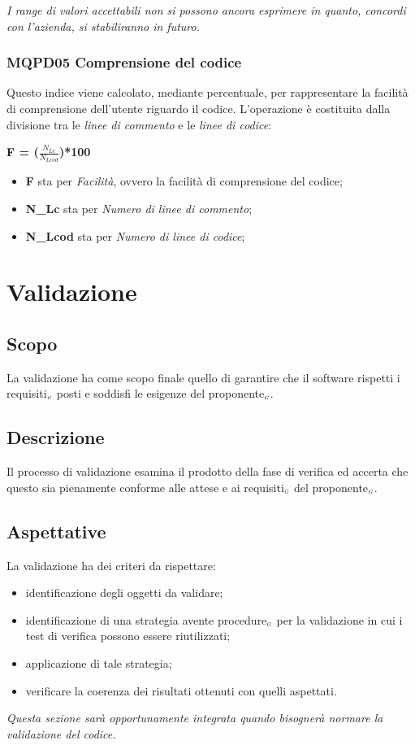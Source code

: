\textit{I range di valori accettabili non si possono ancora esprimere in quanto, concordi con l'azienda, si stabiliranno in futuro.}

\subsubsection{MQPD05 Comprensione del codice}\label{ProcessiDiSupportoVerificaMetricheMQPD05CompresioneDelCodice}
Questo indice viene calcolato, mediante percentuale, per rappresentare la facilità di comprensione dell'utente riguardo il codice.
L'operazione è costituita dalla divisione tra le \textit{linee di commento} e le \textit{linee di codice}:
\begin{center}
	\textbf{F = ($\frac{N_{Lc}}{N_{Lcod}}$)*100}
\end{center}
\begin{itemize}
	\item \textbf{F} sta per \textit{Facilità}, ovvero la facilità di comprensione del codice;
	\item \textbf{N\_Lc} sta per \textit{Numero di linee di commento};
	\item \textbf{N\_Lcod} sta per \textit{Numero di linee di codice};
\end{itemize}

\section{Validazione} \label{ProcessiDiSupportoValidazione}
\subsection{Scopo} \label{ProcessiDiSupportoValidazioneScopo}
La validazione ha come scopo finale quello di garantire che il software rispetti i requisiti$_{\scaleto{G}{3pt}}$ posti e soddisfi le esigenze del proponente$_{\scaleto{G}{3pt}}$.
\subsection{Descrizione} \label{ProcessiDiSupportoValidazioneDescrizione}
Il processo di validazione esamina il prodotto della fase di verifica ed accerta che questo sia pienamente conforme alle attese e ai requisiti$_{\scaleto{G}{3pt}}$ del proponente$_{\scaleto{G}{3pt}}$. 
\subsection{Aspettative} \label{ProcessiDiSupportoValidazioneAspettative}
La validazione ha dei criteri da rispettare:
\begin{itemize}
	\item identificazione degli oggetti da validare;
	\item identificazione di una strategia avente procedure$_{\scaleto{G}{3pt}}$ per la validazione in cui i test di verifica possono essere riutilizzati;
	\item applicazione di tale strategia;
	\item verificare la coerenza dei risultati ottenuti con quelli aspettati.
\end{itemize}
\textit{Questa sezione sarà opportunamente integrata quando bisognerà normare la validazione del codice.}